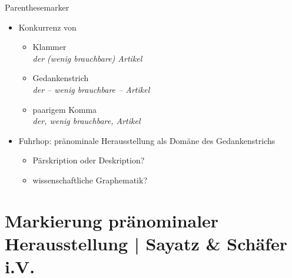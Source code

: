 \begin{frame}
  {Parenthesemarker}
  \begin{itemize}[<+->]
    \item Konkurrenz von
      \begin{itemize}[<+->]
        \item Klammer\\
          \textit{\alert{der (wenig brauchbare) Artikel}}
        \item Gedankenstrich\\
          \textit{\alert{der -- wenig brauchbare -- Artikel}}
        \item paarigem Komma\\
          \textit{\alert{der, wenig brauchbare, Artikel}}
      \end{itemize}
      \Zeile
    \item Fuhrhop: pränominale Herausstellung als Domäne des Gedankenstrichs
      \begin{itemize}[<+->]
        \item Pärskription oder Deskription?
        \item wissenschaftliche Graphematik?
      \end{itemize}
  \end{itemize}
\end{frame}

\section[Herausstellung]{Markierung pränominaler Herausstellung | Sayatz \& Schäfer i.V.}


